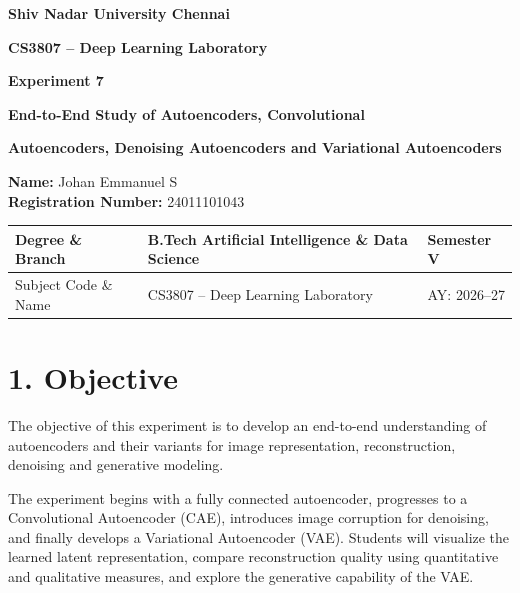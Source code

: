 \documentclass[10pt]{article}
\begin{document}

\begin{center}

{\large\textbf{Shiv Nadar University Chennai}}

\vspace{2mm}

{\normalsize\textbf{CS3807 -- Deep Learning Laboratory}}

\vspace{2mm}

{\large\textbf{Experiment 7}}

\vspace{1mm}

{\normalsize\textbf{End-to-End Study of Autoencoders, Convolutional}}

{\normalsize\textbf{Autoencoders, Denoising Autoencoders and Variational Autoencoders}}

\end{center}

\begin{flushleft}
\textbf{Name:} Johan Emmanuel S\\
\textbf{Registration Number:} 24011101043\\
\end{flushleft}

\vspace{3mm}

\begin{tabular}{|p{3.4cm}|p{9.0cm}|p{1.4cm}|}
\hline
Degree \& Branch &
B.Tech Artificial Intelligence \& Data Science &
Semester V\\
\hline
Subject Code \& Name &
CS3807 -- Deep Learning Laboratory &
AY: 2026--27\\
\hline
\end{tabular}

\section*{1. Objective}

The objective of this experiment is to develop an end-to-end understanding of
autoencoders and their variants for image representation, reconstruction,
denoising and generative modeling.

The experiment begins with a fully connected autoencoder, progresses to a
Convolutional Autoencoder (CAE), introduces image corruption for denoising,
and finally develops a Variational Autoencoder (VAE). Students will visualize
the learned latent representation, compare reconstruction quality using
quantitative and qualitative measures, and explore the generative capability
of the VAE.
\end{document}

